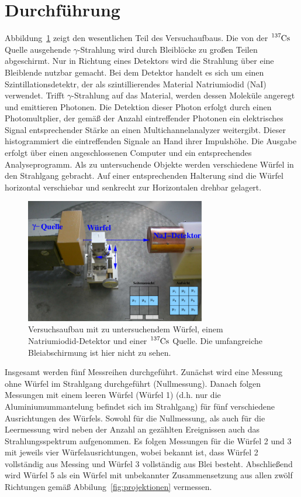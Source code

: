 \section{Durchführung}
\label{sec:durchführung}

Abbildung~\ref{fig:aufbau} zeigt den wesentlichen Teil des Versuchaufbaus. Die
von der $\ce{^{137}Cs}$ Quelle ausgehende $\gamma$-Strahlung wird durch
Bleiblöcke zu großen Teilen abgeschirmt. Nur in Richtung eines Detektors wird
die Strahlung über eine Bleiblende nutzbar gemacht. Bei dem Detektor handelt es
sich um einen Szintillationsdetektr, der als szintillierendes Material
Natriumiodid (NaI) verwendet. Trifft $\gamma$-Strahlung auf das Material, werden
dessen Moleküle angeregt und emittieren Photonen. Die Detektion dieser Photon
erfolgt durch einen Photomultplier, der gemäß der Anzahl eintreffender Photonen
ein elektrisches Signal entsprechender Stärke an einen Multichannelanalyzer
weitergibt. Dieser histogrammiert die eintreffenden Signale an Hand ihrer
Impulshöhe. Die Ausgabe erfolgt über einen angeschlossenen Computer und ein
entsprechendes Analyseprogramm. Als zu untersuchende Objekte werden verschiedene
Würfel in den Strahlgang gebracht. Auf einer entsprechenden Halterung sind die
Würfel horizontal verschiebar und senkrecht zur Horizontalen drehbar gelagert.

\begin{figure}
  \centering
  \includegraphics[width=0.7\textwidth]{figures/aufbau.pdf}
  \caption{Versuchsaufbau mit zu untersuchendem Würfel, einem 
  Natriumiodid-Detektor und einer $\ce{^{137}Cs}$ Quelle. Die umfangreiche
  Bleiabschirmung ist hier nicht zu sehen.}
  \label{fig:aufbau}
\end{figure}

Insgesamt werden fünf Messreihen durchgeführt. Zunächst wird eine Messung ohne
Würfel im Strahlgang durchgeführt (Nullmessung). Danach folgen Messungen mit
einem leeren Würfel (Würfel 1) (d.h. nur die Aluminiumummantelung befindet sich
im Strahlgang) für fünf verschiedene Ausrichtungen des Würfels. Sowohl für die
Nullmessung, als auch für die Leermessung wird neben der Anzahl an gezählten
Ereignissen auch das Strahlungsspektrum aufgenommen. Es folgen Messungen für die
Würfel 2 und 3 mit jeweils vier Würfelausrichtungen, wobei bekannt ist, dass
Würfel 2 vollständig aus Messing und Würfel 3 vollständig aus Blei besteht.
Abschließend wird Würfel 5 als ein Würfel mit unbekannter Zusammensetzung aus
allen zwölf Richtungen gemäß Abbilung~\ref{fig:projektionen} vermessen.

